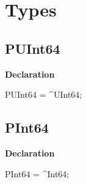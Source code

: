 \documentclass{report}
\newif\ifpdf
\begin{document}
\section{Types}
\ifpdf
\subsection*{\large{\textbf{PUInt64}}\normalsize\hspace{1ex}\hrulefill}
\else
\subsection*{PUInt64}
\fi
\label{primesieve-PUInt64}
\begin{list}{}{
\setlength{\itemindent}{0cm}
\setlength{\listparindent}{0cm}
\setlength{\leftmargin}{\evensidemargin}
\addtolength{\leftmargin}{\tmplength}
\settowidth{\labelsep}{X}
\addtolength{\leftmargin}{\labelsep}
\setlength{\labelwidth}{\tmplength}
}
\item[\textbf{Declaration}\hfill]
\ifpdf
\begin{flushleft}
\fi
\begin{ttfamily}
PUInt64 = {\^{}}UInt64;\end{ttfamily}

\ifpdf
\end{flushleft}
\fi

\end{list}
\ifpdf
\subsection*{\large{\textbf{PInt64}}\normalsize\hspace{1ex}\hrulefill}
\else
\subsection*{PInt64}
\fi
\label{primesieve-PInt64}
\begin{list}{}{
\setlength{\itemindent}{0cm}
\setlength{\listparindent}{0cm}
\setlength{\leftmargin}{\evensidemargin}
\addtolength{\leftmargin}{\tmplength}
\settowidth{\labelsep}{X}
\addtolength{\leftmargin}{\labelsep}
\setlength{\labelwidth}{\tmplength}
}
\item[\textbf{Declaration}\hfill]
\ifpdf
\begin{flushleft}
\fi
\begin{ttfamily}
PInt64 = {\^{}}Int64;\end{ttfamily}

\ifpdf
\end{flushleft}
\fi

\end{list}
\end{document}
